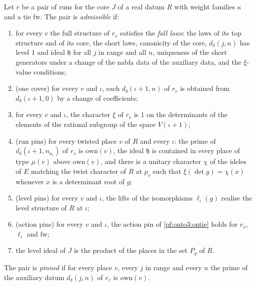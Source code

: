 \begin{definition}\label{pf:onto3:runsok}
Let $r$ be a pair of runs for the core $J$ of a real datum $R$ with weight families $\kappa$ and a tie $\mathrm{fw}$.
The pair is \emph{admissible} if:
\begin{enumerate}[label=(\roman*)]
\item for every $v$ the full structure of $r_v$ satisfies the \emph{full laws}: the laws of its top structure and of its
core, the short laws, canonicity of the core, $d_\delta(j,n)$ has level $1$ and ideal $\mathfrak h$ for all $j$ in
range and all $n$, uniqueness of the short generators under a change of the nabla data of the auxiliary data, and the
$\xi$-value conditions;
\item (one cover) for every $v$ and $\iota$, each $d_\delta(\iota+1,n)$ of $r_v$ is obtained from $d_\delta(\iota+1,0)$
by a change of coefficients;
\item for every $v$ and $\iota$, the character $\xi$ of $r_v$ is $1$ on the determinants of the elements of the rational
subgroup of the space $V(\iota+1)$;
\item (run pins) for every twisted place $v$ of $R$ and every $\iota$: the prime of $d_\delta(\iota+1,n_{\kappa_\iota})$ of
$r_v$ is $\mathrm{own}(v)$, the ideal $\mathfrak h$ is contained in every place of type $\mu(v)$ above $\mathrm{own}(v)$, and
there is a unitary character $\chi$ of the ideles of $E$ matching the twist character of $R$ at $p_v$ such that
$\xi(\det g)=\chi(x)$ whenever $x$ is a determinant root of $g$;
\item (level pins) for every $v$ and $\iota$, the lifts of the isomorphisms $\ell_\iota(g)$ realise the level structure of
$R$ at $\iota$;
\item (action pins) for every $v$ and $\iota$, the action pin of \cref{pf:onto3:ontie} holds for $r_v$, $\ell_\iota$ and
$\mathrm{fw}$;
\item the level ideal of $J$ is the product of the places in the set $P_g$ of $R$.
\end{enumerate}
The pair is \emph{pinned} if for every place $v$, every $j$ in range and every $n$ the prime of the auxiliary datum
$d_\delta(j,n)$ of $r_v$ is $\mathrm{own}(v)$.
\end{definition}

